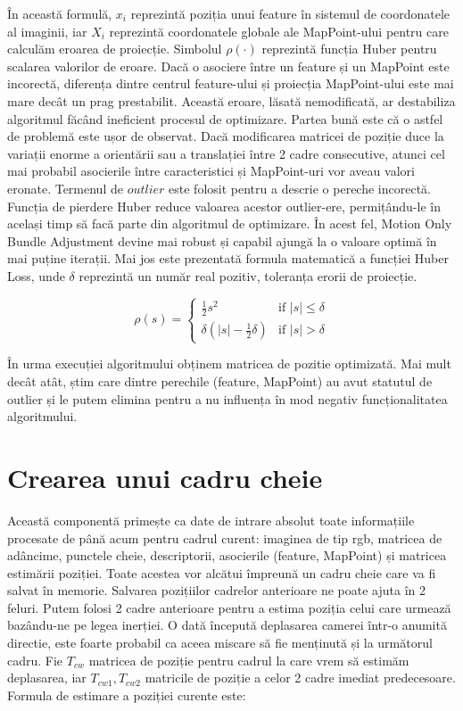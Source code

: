 \documentclass[12pt,a4paper]{report}
\begin{document}
În această formulă, \(x_i\) reprezintă poziția unui feature în sistemul de 
coordonatele al imaginii, iar \(X_i\) reprezintă coordonatele globale ale MapPoint-ului pentru care calculăm eroarea
de proiecție. Simbolul $ \rho(\cdot) $ reprezintă funcția Huber\cite{huber1964} pentru scalarea valorilor de eroare.
Dacă o asociere între un feature și un MapPoint este incorectă, diferența dintre centrul feature-ului
și proiecția MapPoint-ului este mai mare decât un prag prestabilit. Această eroare, lăsată nemodificată,
ar destabiliza algoritmul făcând ineficient procesul de optimizare. Partea bună este că o astfel de problemă
este ușor de observat. Dacă modificarea matricei de poziție duce la variații enorme a orientării sau a translației
între 2 cadre consecutive, atunci cel mai probabil asocierile între caracteristici și MapPoint-uri vor aveau valori eronate. 
Termenul de \(outlier\) este folosit pentru a descrie o pereche incorectă. Funcția de pierdere Huber reduce 
valoarea acestor outlier-ere, permițându-le în același timp să facă parte din algoritmul de 
optimizare. În acest fel, Motion Only Bundle Adjustment devine mai robust și capabil ajungă la o valoare optimă 
în mai puține iterații. Mai jos este prezentată formula matematică a funcției Huber Loss, 
unde $ \delta $ reprezintă un număr real pozitiv, toleranța erorii de proiecție. 

\begin{equation}
\rho(s) =
\begin{cases}
\frac{1}{2}s^2 & \text{if } |s| \leq \delta \\
\delta (|s| - \frac{1}{2}\delta) & \text{if } |s| > \delta
\end{cases}
\end{equation}

În urma execuției algoritmului obținem matricea de pozitie optimizată. Mai mult decât atât,
știm care dintre perechile (feature, MapPoint) au avut statutul de outlier și le putem 
elimina pentru a nu influența în mod negativ funcționalitatea algoritmului.

\section{Crearea unui cadru cheie}
Această componentă primește ca date de intrare absolut toate informațiile procesate de 
până acum pentru cadrul curent: imaginea de tip rgb, matricea de adâncime, punctele cheie,
descriptorii, asocierile (feature, MapPoint) și matricea estimării poziției. 
Toate acestea vor alcătui împreună un cadru cheie care va fi salvat în memorie.
Salvarea pozițiilor cadrelor anterioare ne poate ajuta în 2 feluri. Putem folosi 2 
cadre anterioare pentru a estima poziția celui care urmează bazându-ne pe legea inerției. 
O dată începută deplasarea camerei într-o anumită directie, este foarte 
probabil ca aceea miscare să fie menținută și la următorul cadru. Fie \(T_{cw}\) matricea de 
poziție pentru cadrul la care vrem să estimăm deplasarea, iar \(T_{cw1}, T_{cw2} \) matricile 
de poziție a celor 2 cadre imediat predecesoare. Formula de estimare a poziției curente este:
\end{document}
